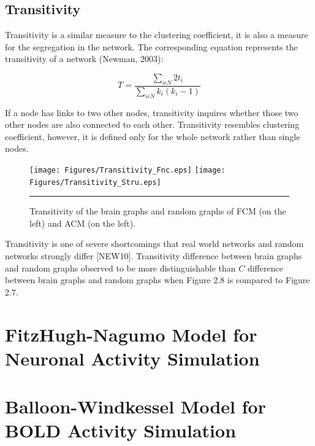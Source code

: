 \subsection{Transitivity}

Transitivity is a similar measure to the clustering coefficient, it is also a measure for the segregation in the network.  The corresponding equation represents the transitivity of a network (Newman, 2003):
	
\begin{equation}
 T = \frac{\sum\limits_{i \epsilon N} 2 t_i}{\sum\limits_{i \epsilon N}k_i (k_i - 1)}
\end{equation}	

If a node has links to two other nodes, transitivity inquires whether those two other nodes are also connected to each other. Transitivity resembles clustering coefficient, however, it is defined only for the whole network rather than single nodes. 

\begin{figure}[htbp]
  \centering
	\texttt{[image: Figures/Transitivity\_Fnc.eps]}
	\texttt{[image: Figures/Transitivity\_Stru.eps]} 
    \rule{35em}{0.5pt}
    \caption[Transitivity]{Transitivity of the brain graphs and random graphs of FCM (on the left) and ACM (on the left). }
  \label{fig:Transitivity}
\end{figure}


Transitivity is one of severe shortcomings that real world networks and random networks strongly differ [NEW10]. Transitivity difference between brain graphs and random graphs observed to be more distinguishable than $C$ difference between brain graphs and random graphs when Figure 2.8 is compared to Figure 2.7. 



\section{FitzHugh-Nagumo Model for Neuronal Activity Simulation}

\section{Balloon-Windkessel Model for BOLD Activity Simulation} 
 
